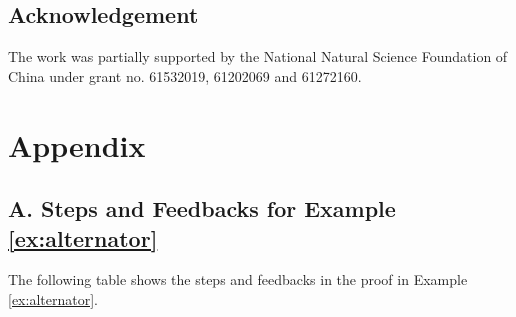 \documentclass{llncs}
\begin{document}
\subsection*{Acknowledgement}
\noindent The work was partially supported by the National Natural Science Foundation of China under grant no. 61532019, 61202069 and 61272160.

\section*{Appendix}

\subsection*{A. Steps and Feedbacks for Example \ref{ex:alternator}}
The following table shows the steps and feedbacks in the proof in Example \ref{ex:alternator}.
\end{document}
